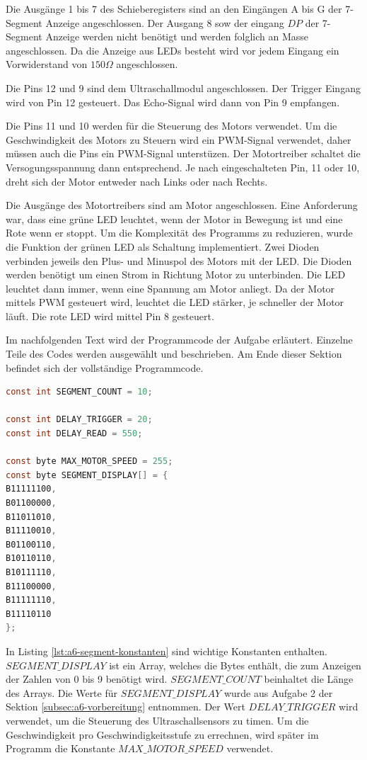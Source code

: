 \newpage

Die Ausgänge 1 bis 7 des Schieberegisters sind an den Eingängen A bis G der 7-Segment Anzeige angeschlossen.
Der Ausgang 8 sow der eingang $DP$ der 7-Segment Anzeige werden nicht benötigt und werden folglich an Masse angeschlossen.
Da die Anzeige aus LEDs besteht wird vor jedem Eingang ein Vorwiderstand von $150\Omega$ angeschlossen.

Die Pins 12 und 9 sind dem Ultraschallmodul angeschlossen.
Der Trigger Eingang wird von Pin 12 gesteuert.
Das Echo-Signal wird dann von Pin 9 empfangen.

Die Pins 11 und 10 werden für die Steuerung des Motors verwendet.
Um die Geschwindigkeit des Motors zu Steuern wird ein PWM-Signal verwendet, daher müssen auch die Pins ein PWM-Signal unterstüzen.
Der Motortreiber schaltet die Versogungsspannung dann entsprechend.
Je nach eingeschalteten Pin, 11 oder 10, dreht sich der Motor entweder nach Links oder nach Rechts.

Die Ausgänge des Motortreibers sind am Motor angeschlossen.
Eine Anforderung war, dass eine grüne LED leuchtet, wenn der Motor in Bewegung ist und eine Rote wenn er stoppt.
Um die Komplexität des Programms zu reduzieren, wurde die Funktion der grünen LED als Schaltung implementiert.
Zwei Dioden verbinden jeweils den Plus- und Minuspol des Motors mit der LED.
Die Dioden werden benötigt um einen Strom in Richtung Motor zu unterbinden.
Die LED leuchtet dann immer, wenn eine Spannung am Motor anliegt.
Da der Motor mittels PWM gesteuert wird, leuchtet die LED stärker, je schneller der Motor läuft.
Die rote LED wird mittel Pin 8 gesteuert.

Im nachfolgenden Text wird der Programmcode der Aufgabe erläutert.
Einzelne Teile des Codes werden ausgewählt und beschrieben.
Am Ende dieser Sektion befindet sich der vollständige Programmcode.

\newpage

\begin{lstlisting}[language=C,label={lst:a6-segment-konstanten}, caption={Wichtige Konstanten}]
const int SEGMENT_COUNT = 10;

const int DELAY_TRIGGER = 20;
const int DELAY_READ = 550;

const byte MAX_MOTOR_SPEED = 255;
const byte SEGMENT_DISPLAY[] = {
B11111100,
B01100000,
B11011010,
B11110010,
B01100110,
B10110110,
B10111110,
B11100000,
B11111110,
B11110110
};
\end{lstlisting}

In Listing \ref{lst:a6-segment-konstanten} sind wichtige Konstanten enthalten.
$SEGMENT\_DISPLAY$ ist ein Array, welches die Bytes enthält, die zum Anzeigen der Zahlen von 0 bis 9 benötigt wird.
$SEGMENT\_COUNT$ beinhaltet die Länge des Arrays.
Die Werte für $SEGMENT\_DISPLAY$ wurde aus Aufgabe 2 der Sektion \ref{subsec:a6-vorbereitung} entnommen.
Der Wert $DELAY\_TRIGGER$ wird verwendet, um die Steuerung des Ultraschallsensors zu timen.
Um die Geschwindigkeit pro Geschwindigkeitsstufe zu errechnen, wird später im Programm die Konstante $MAX\_MOTOR\_SPEED$ verwendet.


